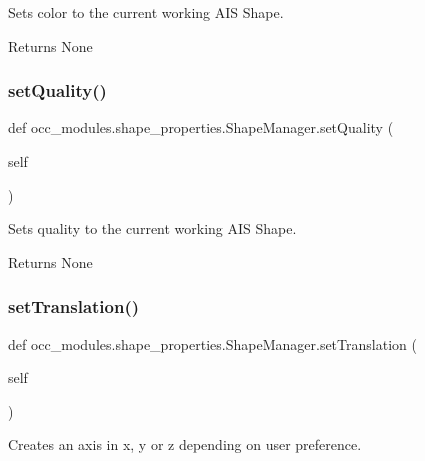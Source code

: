 Sets color to the current working A\+IS Shape. 

\begin{DoxyReturn}{Returns}
None 
\end{DoxyReturn}
\hypertarget{a00094_abe8c1dbcfe98b9f86a0560dd1e8b853a}{}\label{a00094_abe8c1dbcfe98b9f86a0560dd1e8b853a} 
\subsubsection{\texorpdfstring{set\+Quality()}{setQuality()}}
{\footnotesize\ttfamily def occ\+\_\+modules.\+shape\+\_\+properties.\+Shape\+Manager.\+set\+Quality (\begin{DoxyParamCaption}\item[{}]{self }\end{DoxyParamCaption})}



Sets quality to the current working A\+IS Shape. 

\begin{DoxyReturn}{Returns}
None 
\end{DoxyReturn}
\hypertarget{a00094_a1cab1ea26a1cd0091d88106b6b4715bb}{}\label{a00094_a1cab1ea26a1cd0091d88106b6b4715bb} 
\subsubsection{\texorpdfstring{set\+Translation()}{setTranslation()}}
{\footnotesize\ttfamily def occ\+\_\+modules.\+shape\+\_\+properties.\+Shape\+Manager.\+set\+Translation (\begin{DoxyParamCaption}\item[{}]{self }\end{DoxyParamCaption})}



Creates an axis in x, y or z depending on user preference. 

